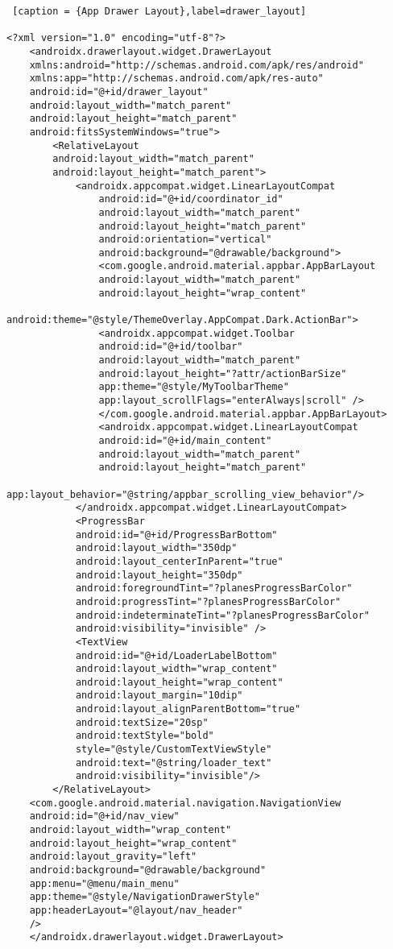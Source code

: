 \begin{lstlisting} [caption = {App Drawer Layout},label=drawer_layout]

<?xml version="1.0" encoding="utf-8"?>
	<androidx.drawerlayout.widget.DrawerLayout
	xmlns:android="http://schemas.android.com/apk/res/android"
	xmlns:app="http://schemas.android.com/apk/res-auto"
	android:id="@+id/drawer_layout"
	android:layout_width="match_parent"
	android:layout_height="match_parent"
	android:fitsSystemWindows="true">
		<RelativeLayout
		android:layout_width="match_parent"
		android:layout_height="match_parent">
			<androidx.appcompat.widget.LinearLayoutCompat
				android:id="@+id/coordinator_id"
				android:layout_width="match_parent"
				android:layout_height="match_parent"
				android:orientation="vertical"
				android:background="@drawable/background">
				<com.google.android.material.appbar.AppBarLayout
				android:layout_width="match_parent"
				android:layout_height="wrap_content"
				android:theme="@style/ThemeOverlay.AppCompat.Dark.ActionBar">
				<androidx.appcompat.widget.Toolbar
				android:id="@+id/toolbar"
				android:layout_width="match_parent"
				android:layout_height="?attr/actionBarSize"
				app:theme="@style/MyToolbarTheme"
				app:layout_scrollFlags="enterAlways|scroll" />
				</com.google.android.material.appbar.AppBarLayout>
				<androidx.appcompat.widget.LinearLayoutCompat
				android:id="@+id/main_content"
				android:layout_width="match_parent"
				android:layout_height="match_parent"
				app:layout_behavior="@string/appbar_scrolling_view_behavior"/>
			</androidx.appcompat.widget.LinearLayoutCompat>
			<ProgressBar
			android:id="@+id/ProgressBarBottom"
			android:layout_width="350dp"
			android:layout_centerInParent="true"
			android:layout_height="350dp"
			android:foregroundTint="?planesProgressBarColor"
			android:progressTint="?planesProgressBarColor"
			android:indeterminateTint="?planesProgressBarColor"
			android:visibility="invisible" />
			<TextView
			android:id="@+id/LoaderLabelBottom"
			android:layout_width="wrap_content"
			android:layout_height="wrap_content"
			android:layout_margin="10dip"
			android:layout_alignParentBottom="true"
			android:textSize="20sp"
			android:textStyle="bold"
			style="@style/CustomTextViewStyle"
			android:text="@string/loader_text"
			android:visibility="invisible"/>
		</RelativeLayout>
	<com.google.android.material.navigation.NavigationView
	android:id="@+id/nav_view"
	android:layout_width="wrap_content"
	android:layout_height="wrap_content"
	android:layout_gravity="left"
	android:background="@drawable/background"
	app:menu="@menu/main_menu"
	app:theme="@style/NavigationDrawerStyle"
	app:headerLayout="@layout/nav_header"
	/>
	</androidx.drawerlayout.widget.DrawerLayout>
\end{lstlisting}
 
